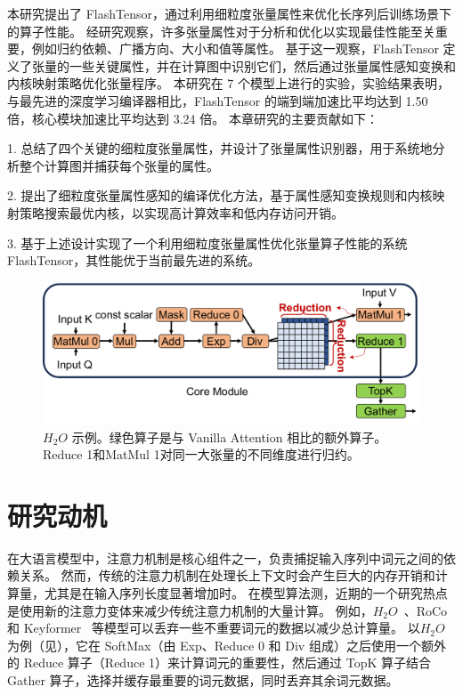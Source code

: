 本研究提出了 FlashTensor，通过利用细粒度张量属性来优化长序列后训练场景下的算子性能。
经研究观察，许多张量属性对于分析和优化以实现最佳性能至关重要，例如归约依赖、广播方向、大小和值等属性。
基于这一观察，FlashTensor 定义了张量的一些关键属性，并在计算图中识别它们，然后通过张量属性感知变换和内核映射策略优化张量程序。
本研究在 7 个模型上进行的实验，实验结果表明，与最先进的深度学习编译器相比，FlashTensor 的端到端加速比平均达到 1.50 倍，核心模块加速比平均达到 3.24 倍。
本章研究的主要贡献如下：

1. 总结了四个关键的细粒度张量属性，并设计了张量属性识别器，用于系统地分析整个计算图并捕获每个张量的属性。

2. 提出了细粒度张量属性感知的编译优化方法，基于属性感知变换规则和内核映射策略搜索最优内核，以实现高计算效率和低内存访问开销。

3. 基于上述设计实现了一个利用细粒度张量属性优化张量算子性能的系统 FlashTensor，其性能优于当前最先进的系统。

\begin{figure}[ht]
    \centering
    \includegraphics[width=0.7\linewidth]{figures/flashtensor/motivation_example_h2o_overview.pdf}
    \caption{\(H_{2}O\) 示例。绿色算子是与 Vanilla Attention 相比的额外算子。Reduce 1和MatMul 1对同一大张量的不同维度进行归约。
    }
    \label{fig:flashtensor-motivation_example_h2o_overview}
\end{figure}

\section{研究动机}

在大语言模型中，注意力机制是核心组件之一，负责捕捉输入序列中词元之间的依赖关系。
然而，传统的注意力机制在处理长上下文时会产生巨大的内存开销和计算量，尤其是在输入序列长度显著增加时。
在模型算法测，近期的一个研究热点是使用新的注意力变体来减少传统注意力机制的大量计算。
例如，\(H_{2}O\)~\cite{zhang2024h2o}、RoCo~\cite{ren2024roco} 和 Keyformer~\cite{adnan2024keyformer} 等模型可以丢弃一些不重要词元的数据以减少总计算量。
以\(H_{2}O\)为例（见），它在 SoftMax（由 Exp、Reduce 0 和 Div 组成）之后使用一个额外的 Reduce 算子（Reduce 1）来计算词元的重要性，然后通过 TopK 算子结合 Gather 算子，选择并缓存最重要的词元数据，同时丢弃其余词元数据。

